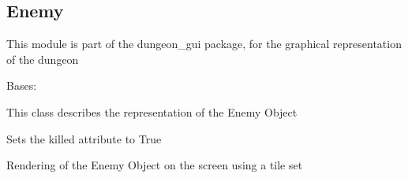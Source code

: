\documentclass[letterpaper,10pt,english]{sphinxmanual}
\begin{document}
\sphinxstepscope


\subsection{Enemy}
\label{\detokenize{api_reference/dungeon_gui/Enemy:module-Enemy}}\label{\detokenize{api_reference/dungeon_gui/Enemy:enemy}}\label{\detokenize{api_reference/dungeon_gui/Enemy::doc}}
\sphinxAtStartPar
This module is part of the dungeon\_gui package, for the graphical representation of the dungeon

\begin{fulllineitems}
\label{\detokenize{api_reference/dungeon_gui/Enemy:Enemy.Enemy}}
\pysigstartsignatures
{}
\pysigstopsignatures
\sphinxAtStartPar
Bases: 

\sphinxAtStartPar
This class describes the representation of the Enemy Object

\begin{fulllineitems}
\label{\detokenize{api_reference/dungeon_gui/Enemy:Enemy.Enemy.kill}}
\pysigstartsignatures
{}
\pysigstopsignatures
\sphinxAtStartPar
Sets the killed attribute to True

\end{fulllineitems}


\begin{fulllineitems}
\label{\detokenize{api_reference/dungeon_gui/Enemy:Enemy.Enemy.render_enemy}}
\pysigstartsignatures
{}
\pysigstopsignatures
\sphinxAtStartPar
Rendering of the Enemy Object on the screen using a tile set



\end{fulllineitems}
\end{fulllineitems}
\end{document}
